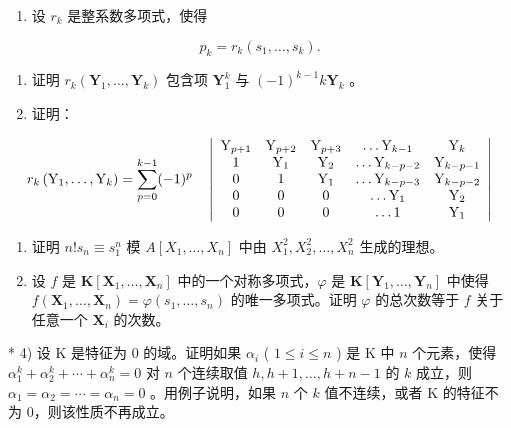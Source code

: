 \BourbakiExerciseGroup

\begin{enumerate}
\def\labelenumi{\arabic{enumi})}
\tightlist
\item
  设 \(r_k\) 是整系数多项式，使得
\end{enumerate}

\[
p _ {k} = r _ {k} (s _ {1}, \dots , s _ {k}).
\]

\begin{enumerate}
\def\labelenumi{\alph{enumi})}
\item
  证明 \(r_k(\mathbf{Y}_1, \ldots, \mathbf{Y}_k)\) 包含项 \(\mathbf{Y}_1^k\) 与 \((-1)^{k-1} k\mathbf{Y}_k\) 。
\item
  证明：
\end{enumerate}

\[
r _ {k} \left(\mathrm{Y} _ {1}, \dots , \mathrm{Y} _ {k}\right) = \sum_ {p = 0} ^ {k - 1} (- 1) ^ {p} \quad \left| \begin{array}{c c c c c} \mathrm{Y} _ {p + 1} & \mathrm{Y} _ {p + 2} & \mathrm{Y} _ {p + 3} & \dots \mathrm{Y} _ {k - 1} & \mathrm{Y} _ {k} \\ 1 & \mathrm{Y} _ {1} & \mathrm{Y} _ {2} & \dots \mathrm{Y} _ {k - p - 2} & \mathrm{Y} _ {k - p - 1} \\ 0 & 1 & \mathrm{Y} _ {1} & \dots \mathrm{Y} _ {k - p - 3} & \mathrm{Y} _ {k - p - 2} \\ 0 & 0 & 0 & \dots \mathrm{Y} _ {1} & \mathrm{Y} _ {2} \\ 0 & 0 & 0 & \dots 1 & \mathrm{Y} _ {1} \end{array} \right|
\]

\begin{enumerate}
\def\labelenumi{\arabic{enumi})}
\setcounter{enumi}{1}
\item
  证明 \(n! s_n \equiv s_1^n\) 模 \(A[X_1, \ldots, X_n]\) 中由 \(X_1^2, X_2^2, \ldots, X_n^2\) 生成的理想。
\item
  设 \(f\) 是 \(\mathbf{K}[\mathbf{X}_1, \ldots, \mathbf{X}_n]\) 中的一个对称多项式，\(\varphi\) 是 \(\mathbf{K}[\mathbf{Y}_1, \ldots, \mathbf{Y}_n]\) 中使得 \(f(\mathbf{X}_1, \ldots, \mathbf{X}_n) = \varphi(s_1, \ldots, s_n)\) 的唯一多项式。证明 \(\varphi\) 的总次数等于 \(f\) 关于任意一个 \(\mathbf{X}_i\) 的次数。
\end{enumerate}

* 4) 设 K 是特征为 0 的域。证明如果 \(\alpha_{i}\) ( \(1 \leqslant i \leqslant n\) ) 是 K 中 \(n\) 个元素，使得 \(\alpha_{1}^{k} + \alpha_{2}^{k} + \cdots + \alpha_{n}^{k} = 0\) 对 \(n\) 个连续取值 \(h, h+1, \ldots, h+n-1\) 的 \(k\) 成立，则 \(\alpha_{1} = \alpha_{2} = \cdots = \alpha_{n} = 0\) 。用例子说明，如果 \(n\) 个 \(k\) 值不连续，或者 K 的特征不为 0，则该性质不再成立。

